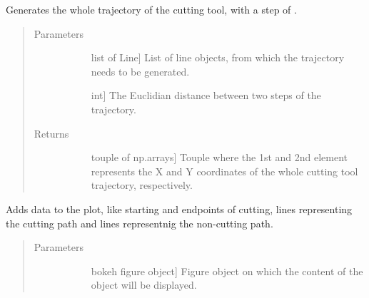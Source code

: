 \documentclass[letterpaper,10pt,english,openany,oneside]{sphinxmanual}
\begin{document}
\begin{fulllineitems}
\begin{fulllineitems}
\label{\detokenize{reference:cnc.visualization.Visualizer.generate_tool_path}}
Generates the whole trajectory of the cutting tool, with a step of
.
\begin{quote}\begin{description}
\item[{Parameters}] \leavevmode\begin{description}
\item[{}] \leavevmode{[}list of Line{]}
List of line objects, from which the trajectory needs to be
generated.

\item[{}] \leavevmode{[}int{]}
The Euclidian distance between two steps of the trajectory.

\end{description}

\item[{Returns}] \leavevmode\begin{description}
\item[{}] \leavevmode{[}touple of np.arrays{]}
Touple where the 1st and 2nd element represents the X and Y
coordinates of the whole cutting tool trajectory, respectively.

\end{description}

\end{description}\end{quote}

\end{fulllineitems}


\begin{fulllineitems}
\label{\detokenize{reference:cnc.visualization.Visualizer.populate_plot}}
Adds data to the plot, like starting and endpoints of cutting, lines
representing the cutting path and lines representnig the non-cutting
path.
\begin{quote}\begin{description}
\item[{Parameters}] \leavevmode\begin{description}
\item[{}] \leavevmode{[}bokeh figure object{]}
Figure object on which the content of the  object will be
displayed.


\end{description}
\end{description}
\end{quote}
\end{fulllineitems}
\end{fulllineitems}
\end{document}
